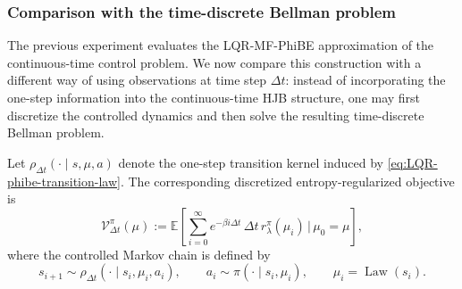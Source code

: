 \documentclass[a4paper, 10pt, english, reqno]{amsart}
\DeclareMathOperator*{\Law}{\text{Law}}
\begin{document}
\subsubsection{Comparison with the time-discrete Bellman problem}
\label{subsubsec:numerics-phibe-vs-discretization}

The previous experiment evaluates the LQR-MF-PhiBE approximation of the
continuous-time control problem. We now compare this construction with a
different way of using observations at time step $\Delta t$: instead of
incorporating the one-step information into the continuous-time HJB
structure, one may first discretize the controlled dynamics and then solve
the resulting time-discrete Bellman problem.

Let $\rho_{\Delta t}(\cdot\mid s,\mu,a)$ denote the one-step transition
kernel induced by \eqref{eq:LQR-phibe-transition-law}. The corresponding
discretized entropy-regularized objective is
\[
  \mathcal V_{\Delta t}^{\pi}(\mu)
  :=
  \mathbb E\left[
    \sum_{i=0}^{\infty}
    e^{-\beta i\Delta t}\,
    \Delta t\, r_\lambda^\pi(\mu_i)
    \,\bigg|\,
    \mu_0=\mu
  \right],
\]
where the controlled Markov chain is defined by
\[
  s_{i+1}\sim \rho_{\Delta t}(\cdot\mid s_i,\mu_i,a_i),
  \qquad
  a_i\sim\pi(\cdot\mid s_i,\mu_i),
  \qquad
  \mu_i=\Law(s_i).
\]
\end{document}

